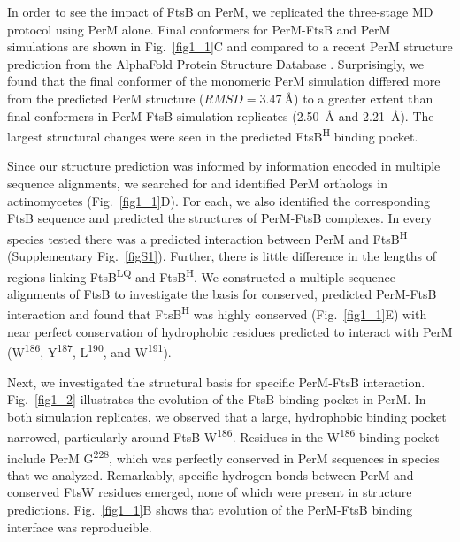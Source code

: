 \documentclass[pdflatex,sn-basic]{sn-jnl}%
\newcommand\ftsbLQ{FtsB\textsuperscript{LQ}}
\newcommand\ftsbH{FtsB\textsuperscript{H}}
\begin{document}
In order to see the impact of FtsB on PerM, we replicated the three-stage MD protocol using PerM alone.
Final conformers for PerM-FtsB and PerM simulations are shown in Fig.~\ref{fig1_1}C and compared to a recent PerM structure prediction from the AlphaFold Protein Structure Database \citep{varadiAlphaFoldProteinStructure2022}.
Surprisingly, we found that the final conformer of the monomeric PerM simulation differed more from the predicted PerM structure ($RMSD=\qty{3.47}{\angstrom}$) to a greater extent than final conformers in PerM-FtsB simulation replicates (\qty{2.50}{\angstrom} and \qty{2.21}{\angstrom}).
The largest structural changes were seen in the predicted \ftsbH{} binding pocket.

Since our structure prediction was informed by information encoded in multiple sequence alignments, we searched for and identified PerM orthologs in actinomycetes (Fig.~\ref{fig1_1}D).
For each, we also identified the corresponding FtsB sequence and predicted the structures of PerM-FtsB complexes.
In every species tested there was a predicted interaction between PerM and \ftsbH{} (Supplementary Fig.~\ref{figS1}). Further, there is little difference in the lengths of regions linking \ftsbLQ{} and \ftsbH{}.
We constructed a multiple sequence alignments of FtsB to investigate the basis for conserved, predicted PerM-FtsB interaction and found that \ftsbH{} was highly conserved (Fig.~\ref{fig1_1}E) with near perfect conservation of hydrophobic residues predicted to interact with PerM (W\textsuperscript{186}, Y\textsuperscript{187}, L\textsuperscript{190}, and W\textsuperscript{191}).

Next, we investigated the structural basis for specific PerM-FtsB interaction. Fig.~\ref{fig1_2} illustrates the evolution of the FtsB binding pocket in PerM.
In both simulation replicates, we observed that a large, hydrophobic binding pocket narrowed, particularly around FtsB W\textsuperscript{186}. 
Residues in the W\textsuperscript{186} binding pocket include PerM G\textsuperscript{228}, which was perfectly conserved in PerM sequences in species that we analyzed.
Remarkably, specific hydrogen bonds between PerM and conserved FtsW residues emerged, none of which were present in structure predictions.
Fig.~\ref{fig1_1}B shows that evolution of the PerM-FtsB binding interface was reproducible.
\end{document}
